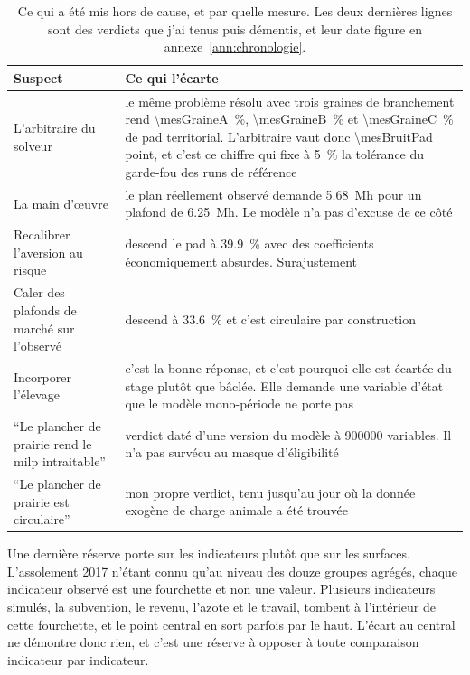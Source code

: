 \begin{table}[h]
  \centering
  \caption{Ce qui a été mis hors de cause, et par quelle mesure. Les deux dernières lignes
  sont des verdicts que j'ai tenus puis démentis, et leur date figure en
  annexe~\ref{ann:chronologie}.}
  \label{tab:ann-solveur}
  \scriptsize
  \setlength{\tabcolsep}{4pt}
  \begin{tabularx}{\textwidth}{@{}p{34mm}X@{}}
    \toprule
    \textbf{Suspect} & \textbf{Ce qui l'écarte} \\
    \midrule
    L'arbitraire du solveur & le même problème résolu avec trois graines de branchement rend
      \SI{\mesGraineA}{\percent}, \SI{\mesGraineB}{\percent} et \SI{\mesGraineC}{\percent} de
      \gls{pad} territorial. L'arbitraire vaut donc \num{\mesBruitPad} point, et c'est ce
      chiffre qui fixe à \SI{5}{\percent} la tolérance du garde-fou des runs de référence \\
    La main d'\oe uvre & le plan réellement observé demande \SI{5.68}{\mega\hour} pour un
      plafond de \SI{6.25}{\mega\hour}. Le modèle n'a pas d'excuse de ce côté \\
    Recalibrer l'aversion au risque & descend le \gls{pad} à \SI{39.9}{\percent} avec des
      coefficients économiquement absurdes. Surajustement \\
    Caler des plafonds de marché sur l'observé & descend à \SI{33.6}{\percent} et c'est
      circulaire par construction \\
    Incorporer l'élevage & c'est la bonne réponse, et c'est pourquoi elle est écartée du stage
      plutôt que bâclée. Elle demande une variable d'état que le modèle mono-période ne porte
      pas \\
    \enquote{Le plancher de prairie rend le \gls{milp} intraitable} & verdict daté d'une
      version du modèle à \num{900000} variables. Il n'a pas survécu au masque
      d'éligibilité \\
    \enquote{Le plancher de prairie est circulaire} & mon propre verdict, tenu jusqu'au jour
      où la donnée exogène de charge animale a été trouvée \\
    \bottomrule
  \end{tabularx}
\end{table}

Une dernière réserve porte sur les indicateurs plutôt que sur les surfaces. L'assolement 2017
n'étant connu qu'au niveau des douze groupes agrégés, chaque indicateur observé est une
fourchette et non une valeur. Plusieurs indicateurs simulés, la subvention, le revenu, l'azote
et le travail, tombent à l'intérieur de cette fourchette, et le point central en sort parfois
par le haut. L'écart au central ne démontre donc rien, et c'est une réserve à opposer à toute
comparaison indicateur par indicateur.
